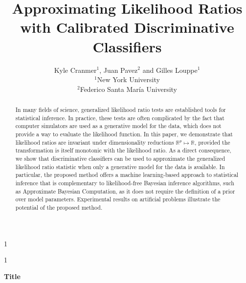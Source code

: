 \documentclass[12pt]{article}
\newcommand{\blind}{1}
\numberwithin{equation}{section}
\theoremstyle{plain}
\begin{document}
\def\spacingset#1{\renewcommand{\baselinestretch}%
{#1}\small\normalsize} \spacingset{1}



\blind
{
  \title{\bf Approximating Likelihood Ratios with Calibrated Discriminative Classifiers}
  \author{Kyle Cranmer$^1$, Juan Pavez$^2$ and Gilles Louppe$^1$\hspace{.2cm}\\
          $^1$New York University\\
          $^2$Federico Santa Mar\'ia University}
  \maketitle
} \fi

\blind
{
  \bigskip
  \bigskip
  \bigskip
  \begin{center}
    {\LARGE\bf Title}
\end{center}
  \medskip
} \fi

\bigskip
\begin{abstract}


In many fields of science, generalized likelihood ratio tests are established tools for
statistical inference. In practice, these tests are often complicated by the fact
that computer simulators are used as a generative model for the data, which does
not provide a way to evaluate the likelihood function. In this paper, we
demonstrate that likelihood ratios are invariant under dimensionality reductions $\mathbb{R}^p \mapsto \mathbb{R}$,
provided the transformation is itself monotonic with the likelihood ratio. As a direct
consequence, we show that discriminative classifiers can be used to
approximate the generalized likelihood ratio statistic when only a generative model for the data is
available. In particular, the proposed method offers a machine learning-based
approach to statistical inference that is complementary to likelihood-free
Bayesian inference algorithms, such as Approximate Bayesian Computation, as it does
not require the definition of a prior over model parameters. Experimental results
on artificial problems illustrate the potential of the proposed method.

\end{abstract}
\end{document}
